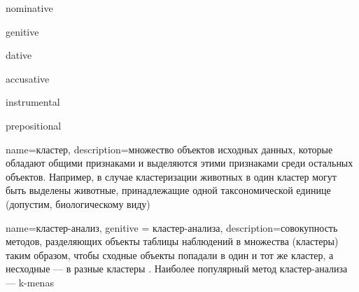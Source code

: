 \glsaddkey
{nominative}%
{}%
{\glsentrynominative}%
{\Glsentrynominative}%
{\glsnom}%
{\Glsnom}%
{\GLSnom}%

\glsaddkey
{genitive}%
{}%
{\glsentrygenitive}%
{\Glsentrygenitive}%
{\glsgen}%
{\Glsgen}%
{\GLSgen}%


\glsaddkey
{dative}%
{}%
{\glsentrydative}%
{\Glsentrydative}%
{\glsdat}%
{\Glsdat}%
{\GLSdat}%


\glsaddkey
{accusative}%
{}%
{\glsentryaccusative}%
{\Glsentryaccusative}%
{\glsacc}%
{\Glsacc}%
{\GLSacc}%

\glsaddkey
{instrumental}%
{}%
{\glsentryinstrumental}%
{\Glsentryinstrumental}%
{\glsins}%
{\Glsins}%
{\GLSins}%

\glsaddkey
{prepositional}%
{}%
{\glsentryprepositional}%
{\Glsentryprepositional}%
{\glspre}%
{\Glspre}%
{\GLSpre}%





{
	name=кластер,
	description={множество объектов исходных данных, которые обладают общими признаками и выделяются этими признаками среди остальных объектов. Например, в случае кластеризации животных в один кластер могут быть выделены животные, принадлежащие одной таксономической единице (допустим, биологическому виду)}
}


{
	name=кластер-анализ,
	genitive = кластер-анализа,
	description={совокупность методов, разделяющих объекты таблицы наблюдений в множества (кластеры) таким образом, чтобы сходные объекты попадали в один и тот же кластер, а несходные --- в разные кластеры \cite{data-science}. Наиболее популярный метод кластер-анализа --- k-menas}
}

